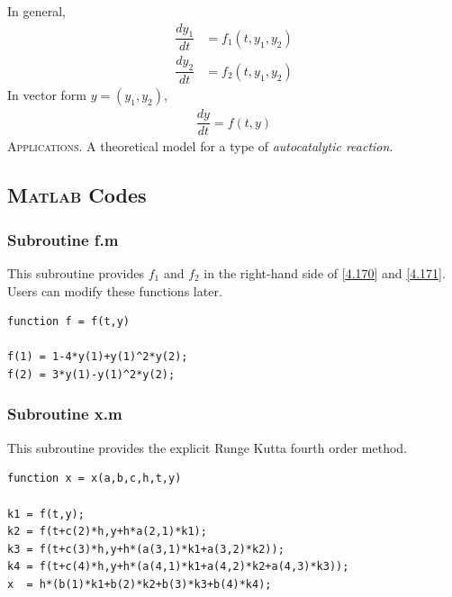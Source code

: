 \documentclass[a4paper,oneside]{book}
\numberwithin{equation}{chapter}
\begin{document}
In general,
\begin{align}
\dfrac{{d{y_1}}}{{dt}} &= {f_1}\left( {t,{y_1},{y_2}} \right)\label{4.170}\\
\dfrac{{d{y_2}}}{{dt}} &= {f_2}\left( {t,{y_1},{y_2}} \right)\label{4.171}
\end{align}
In vector form $y=\left(y_1,y_2\right)$,
\begin{align}
\dfrac{{dy}}{{dt}} = f\left( {t,y} \right)
\end{align}
\textsc{Applications.} A theoretical model for a type of \textit{autocatalytic reaction}.
\subsection{\textsc{Matlab} Codes}
\subsubsection{Subroutine f.m}
This subroutine provides $f_1$ and $f_2$ in the right-hand side of \eqref{4.170} and \eqref{4.171}. Users can modify these functions later.
\begin{verbatim}
function f = f(t,y)

f(1) = 1-4*y(1)+y(1)^2*y(2);
f(2) = 3*y(1)-y(1)^2*y(2);
\end{verbatim}
\subsubsection{Subroutine x.m}
This subroutine provides the explicit Runge Kutta fourth order method.
\begin{verbatim}
function x = x(a,b,c,h,t,y)

k1 = f(t,y);
k2 = f(t+c(2)*h,y+h*a(2,1)*k1);
k3 = f(t+c(3)*h,y+h*(a(3,1)*k1+a(3,2)*k2));
k4 = f(t+c(4)*h,y+h*(a(4,1)*k1+a(4,2)*k2+a(4,3)*k3));
x  = h*(b(1)*k1+b(2)*k2+b(3)*k3+b(4)*k4);
\end{verbatim}
\end{document}
